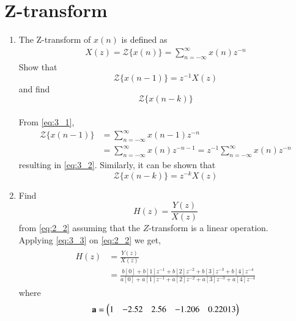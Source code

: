\documentclass[journal,12pt,twocolumn]{IEEEtran}
\renewcommand\thesection{\arabic{section}}
\begin{document}

\section{Z-transform}
\begin{enumerate}[label=\thesection.\arabic*,ref=\thesection.\theenumi]
\item
\label{prob:3_1}

The Z-transform of $x(n)$ is defined as
\begin{align}
\label{eq:3_1}
X(z)={\mathcal {Z}}\{x(n)\}=\sum _{n=-\infty }^{\infty }x(n)z^{-n}
\end{align}
%
Show that
\begin{equation}
\label{eq:3_2}
{\mathcal {Z}}\{x(n-1)\} = z^{-1}X(z)
\end{equation}
and find
\begin{equation}
	{\mathcal {Z}}\{x(n-k)\} 
\end{equation}
\\
\solution From \eqref{eq:3_1},
\begin{align}
{\mathcal {Z}}\{x(n-1)\} &=\sum _{n=-\infty }^{\infty }x(n-1)z^{-n}
\\
&=\sum _{n=-\infty }^{\infty }x(n)z^{-n-1} = z^{-1}\sum _{n=-\infty }^{\infty }x(n)z^{-n}
\end{align}
resulting in \eqref{eq:3_2}. Similarly, it can be shown that
%
\begin{equation}
\label{eq:3_3}
	{\mathcal {Z}}\{x(n-k)\} = z^{-k}X(z)
\end{equation}
\item Find
%
\begin{equation}
H(z) = \frac{Y(z)}{X(z)}
\end{equation}
%
from  \eqref{eq:2_2} assuming that the $Z$-transform is a linear operation.
\\
\solution  Applying \eqref{eq:3_3} on \eqref{eq:2_2} we get,
\begin{align}
\begin{split}
H(z) &= \frac{Y(z)}{X(z)}                
\\
&=\frac{b[0]+b[1]z^{-1}+b[2]z^{-2}+b[3]z^{-3}+b[4]z^{-4}}{a[0]+a[1]z^{-1}+a[2]z^{-2}+a[3]z^{-3}+a[4]z^{-4}}
\label{eq:freq_resp}
\end{split}
\end{align}
where
\begin{align}
\vec{a} &= \myvec{1&-2.52&2.56&-1.206&0.22013}\\

\end{align}
\end{enumerate}
\end{document}
